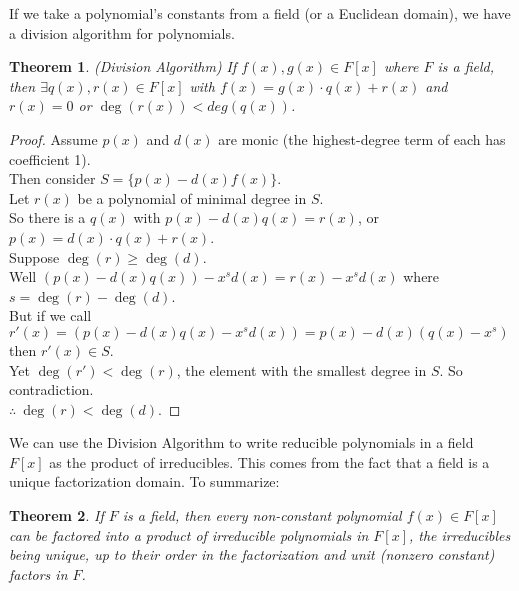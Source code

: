 \documentclass[11pt]{amsart}
\newtheorem{theorem}{Theorem}[section]
\theoremstyle{definition}
\begin{document}
If we take a polynomial's constants from a field (or a Euclidean domain), we have a division algorithm for polynomials.
\begin{theorem}(Division Algorithm)	
	If $f(x), g(x) \in F[x]$ where $F$ is a field, then $\exists q(x), r(x) \in F[x]$ with $f(x) = g(x) \cdot q(x) + r(x)$ and $r(x) = 0$ or 
	$\deg(r(x)) < deg(q(x))$.
\end{theorem}
\begin{proof}
	Assume $p(x)$ and $d(x)$ are monic (the highest-degree term of each has coefficient 1). \\
	Then consider $S = \{ p(x) - d(x)f(x) \}$. \\
	Let $r(x)$ be a polynomial of minimal degree in $S$. \\
	So there is a $q(x)$ with $p(x) - d(x)q(x) = r(x)$, or $p(x) = d(x) \cdot q(x) + r(x)$. \\
	Suppose $\deg(r) \geq \deg(d)$. \\
	Well $(p(x) - d(x)q(x)) - x^s d(x) = r(x) - x^s d(x)$ where $s = \deg(r) - \deg(d)$. \\
	But if we call $r'(x) = (p(x) - d(x)q(x) - x^s d(x)) = p(x) - d(x)(q(x) - x^s)$ then $r'(x) \in S$. \\
	Yet $\deg(r') < \deg(r)$, the element with the smallest degree in $S$. So contradiction. \\
	$\therefore \: \deg(r) < \deg(d)$.
\end{proof}
We can use the Division Algorithm to write reducible polynomials in a field $F[x]$ as the product of irreducibles. This comes
from the fact that a field is a unique factorization domain. To summarize:
\begin{theorem}
	If $F$ is a field, then every non-constant polynomial $f(x) \in F[x]$ can be factored into a product of irreducible polynomials in $F[x]$,
	the irreducibles being unique, up to their order in the factorization and unit (nonzero constant) factors in $F$.
\end{theorem}
\end{document}
